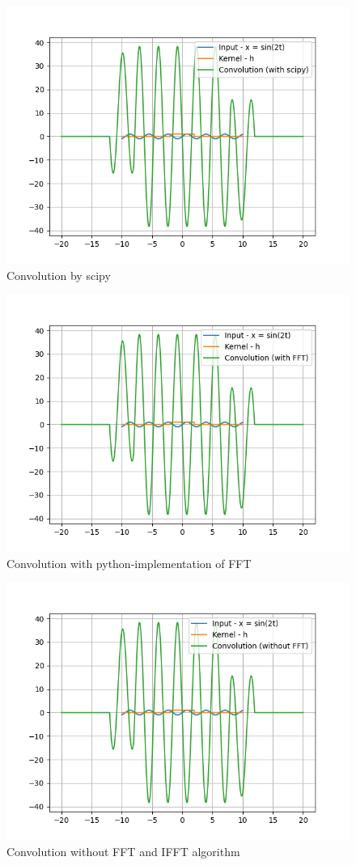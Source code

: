 \begin{figure}[H]
    \centering
    \includegraphics[width=0.7\linewidth]{figs/sci.png}
    \caption{Convolution by scipy}
\end{figure}

\begin{figure}[H]
    \centering
    \includegraphics[width=0.7\linewidth]{figs/FFT.png}
    \caption{Convolution with python-implementation of FFT}
\end{figure}

\begin{figure}[H]
    \centering
    \includegraphics[width=0.7\linewidth]{figs/base.png}
    \caption{Convolution without FFT and IFFT algorithm}
\end{figure}

